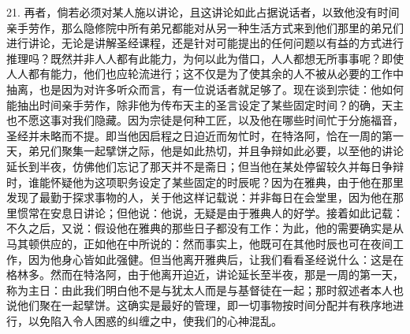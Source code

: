 21. 再者，倘若必须对某人施以讲论，且这讲论如此占据说话者，以致他没有时间亲手劳作，那么隐修院中所有弟兄都能对从另一种生活方式来到他们那里的弟兄们进行讲论，无论是讲解圣经课程，还是针对可能提出的任何问题以有益的方式进行推理吗？既然并非人人都有此能力，为何以此为借口，人人都想无所事事呢？即使人人都有能力，他们也应轮流进行；这不仅是为了使其余的人不被从必要的工作中抽离，也是因为对许多听众而言，有一位说话者就足够了。现在谈到宗徒：他如何能抽出时间亲手劳作，除非他为传布天主的圣言设定了某些固定时间？的确，天主也不愿这事对我们隐藏。因为宗徒是何种工匠，以及他在哪些时间忙于分施福音，圣经并未略而不提。即当他因启程之日迫近而匆忙时，在特洛阿，恰在一周的第一天，弟兄们聚集一起擘饼之际，他是如此热切，并且争辩如此必要，以至他的讲论延长到半夜，仿佛他们忘记了那天并不是斋日；但当他在某处停留较久并每日争辩时，谁能怀疑他为这项职务设定了某些固定的时辰呢？因为在雅典，由于他在那里发现了最勤于探求事物的人，关于他这样记载说：并非每日在会堂里，因为他在那里惯常在安息日讲论；但他说：他说，无疑是由于雅典人的好学。接着如此记载：不久之后，又说：假设他在雅典的那些日子都没有工作：为此，他的需要确实是从马其顿供应的，正如他在中所说的：然而事实上，他既可在其他时辰也可在夜间工作，因为他身心皆如此强健。但当他离开雅典后，让我们看看圣经说什么：这是在格林多。然而在特洛阿，由于他离开迫近，讲论延长至半夜，那是一周的第一天，称为主日：由此我们明白他不是与犹太人而是与基督徒在一起；那时叙述者本人也说他们聚在一起擘饼。这确实是最好的管理，即一切事物按时间分配并有秩序地进行，以免陷入令人困惑的纠缠之中，使我们的心神混乱。\par

